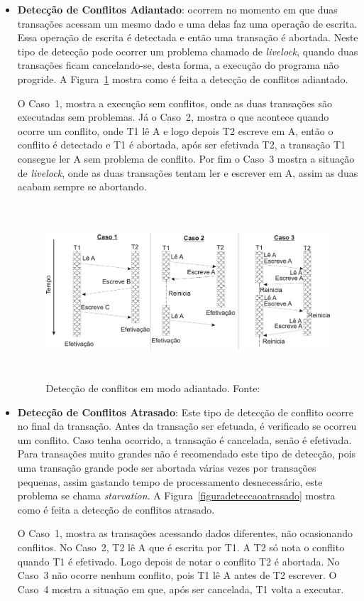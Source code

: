 \documentclass[diss,capa]{texufpel}
\begin{document}
\begin{itemize}
 \item \textbf{Detecção de Conflitos Adiantado}: ocorrem no momento em que duas transações acessam um mesmo dado e uma delas faz uma operação de escrita. Essa operação de escrita é detectada e então uma transação é abortada. Neste tipo de detecção pode ocorrer um problema chamado de \emph{livelock}, quando duas transações ficam cancelando-se, desta forma, a execução do programa não progride. A Figura~\ref{figuradeteccaoadiantado} mostra como é feita a detecção de conflitos adiantado.

 O Caso~1, mostra a execução sem conflitos, onde as duas transações são executadas sem problemas. Já o Caso~2, mostra o que acontece quando ocorre um conflito, onde T1 lê A e logo depois T2 escreve em A, então o conflito é detectado e T1 é abortada, após ser efetivada T2, a transação T1 consegue ler A sem problema de conflito. Por fim o Caso~3 mostra a situação de \emph{livelock}, onde as duas transações tentam ler e escrever em A, assim as duas acabam sempre se abortando.


\begin{figure}[!htp]
\centering
\includegraphics[height=6.5cm]{images/conflitoadiantado.png}
\caption{Detecção de conflitos em modo adiantado. Fonte:~\cite{rigotm}}
\label{figuradeteccaoadiantado}
\end{figure}


 \item \textbf{Detecção de Conflitos Atrasado}: Este tipo de detecção de conflito ocorre no final da transação.  Antes da transação ser efetuada, é verificado se ocorreu um conflito. Caso tenha ocorrido, a transação é cancelada, senão é efetivada. Para transações muito grandes não é recomendado este tipo de detecção, pois uma transação grande pode ser abortada várias vezes por transações pequenas, assim gastando tempo de processamento desnecessário, este problema se chama \emph{starvation}. A Figura~\ref{figuradeteccaoatrasado} mostra como é feita a detecção de conflitos atrasado.

 O Caso~1, mostra as transações acessando dados diferentes, não ocasionando conflitos. No Caso~2, T2 lê A que é escrita por T1. A T2 só nota o conflito quando T1 é efetivado. Logo depois de notar o conflito T2 é abortada. No Caso~3 não ocorre nenhum conflito, pois T1 lê A antes de T2 escrever. O Caso~4 mostra a situação em que, após ser cancelada, T1 volta a executar.
\end{itemize}
\end{document}
